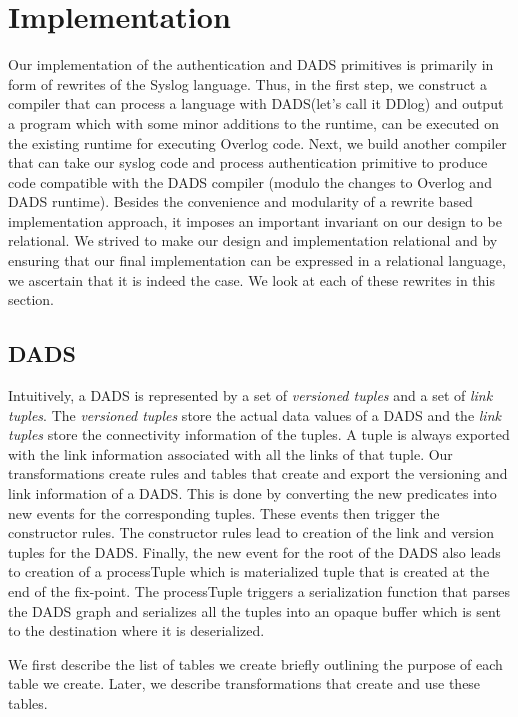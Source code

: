 \section{Implementation} 

Our implementation of the authentication and DADS primitives is primarily in form of rewrites of the Syslog language. Thus, in the first step, we construct a compiler that can process a language with DADS(let's call it DDlog) and output a program which with some minor additions to the runtime, can be executed on the existing runtime for executing Overlog code. Next, we build another compiler that can take our syslog code and process authentication primitive to produce code compatible with the DADS compiler (modulo the changes to Overlog and DADS runtime). Besides the convenience and modularity of a rewrite based implementation approach, it imposes an important invariant on our design to be relational. We strived to make our design and implementation relational and by ensuring that our final implementation can be expressed in a relational language, we ascertain that it is indeed the case. We look at each of these rewrites in this section.

\subsection{DADS}

Intuitively, a DADS is represented by a set of {\em versioned tuples} and a set of {\em link tuples}. The {\em versioned tuples} store the actual data values of a DADS and the {\em link tuples} store the connectivity information of the tuples. A tuple is always exported with the link information associated with all the links of that tuple. Our transformations create rules and tables that create and export the versioning and link information of a DADS. This is done by converting the new predicates into new events for the corresponding tuples. These events then trigger the constructor rules. The constructor rules lead to creation of the link and version tuples for the DADS. Finally, the new event for the root of the DADS also leads to creation of a processTuple which is materialized tuple that is created at the end of the fix-point. The processTuple triggers a serialization function that parses the DADS graph and serializes all the tuples into an opaque buffer which is sent to the destination where it is deserialized.

We first describe the list of tables we create briefly outlining the purpose of each table we create. Later, we describe transformations that create and use these tables. 

